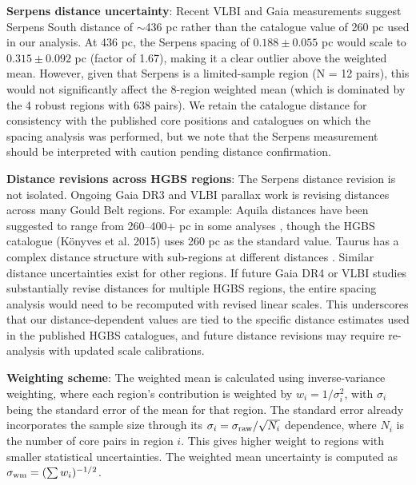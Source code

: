 \documentclass[11pt,a4paper]{article}
\begin{document}
\textbf{Serpens distance uncertainty}: Recent VLBI and Gaia measurements suggest Serpens South distance of $\sim$436 pc \citep{OrtizLeon2018} rather than the catalogue value of 260 pc used in our analysis. At 436 pc, the Serpens spacing of $0.188 \pm 0.055$ pc would scale to $0.315 \pm 0.092$ pc (factor of 1.67), making it a clear outlier above the weighted mean. However, given that Serpens is a limited-sample region (N = 12 pairs), this would not significantly affect the 8-region weighted mean (which is dominated by the 4 robust regions with 638 pairs). We retain the catalogue distance for consistency with the published core positions and catalogues on which the spacing analysis was performed, but we note that the Serpens measurement should be interpreted with caution pending distance confirmation.

\textbf{Distance revisions across HGBS regions}: The Serpens distance revision is not isolated. Ongoing Gaia DR3 and VLBI parallax work is revising distances across many Gould Belt regions. For example: Aquila distances have been suggested to range from 260--400+ pc in some analyses \citep{OrtizLeon2017a}, though the HGBS catalogue (Könyves et al. 2015) uses 260 pc as the standard value. Taurus has a complex distance structure with sub-regions at different distances \citep{Zucker2021}. Similar distance uncertainties exist for other regions. If future Gaia DR4 or VLBI studies substantially revise distances for multiple HGBS regions, the entire spacing analysis would need to be recomputed with revised linear scales. This underscores that our distance-dependent values are tied to the specific distance estimates used in the published HGBS catalogues, and future distance revisions may require re-analysis with updated scale calibrations.

\textbf{Weighting scheme}: The weighted mean is calculated using inverse-variance weighting, where each region's contribution is weighted by $w_i = 1/\sigma_i^2$, with $\sigma_i$ being the standard error of the mean for that region. The standard error already incorporates the sample size through its $\sigma_i = \sigma_{\rm raw}/\sqrt{N_i}$ dependence, where $N_i$ is the number of core pairs in region $i$. This gives higher weight to regions with smaller statistical uncertainties. The weighted mean uncertainty is computed as $\sigma_{\rm wm} = (\sum w_i)^{-1/2}$.
\end{document}
